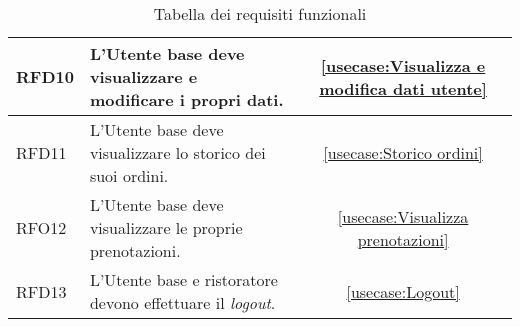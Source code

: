 \begin{table}[H]
\begin{tabularx}{\textwidth}{l|X|c}
		\hline
		RFD10       & L'Utente base deve visualizzare e modificare i propri dati.                                                 				&  \autoref{usecase:Visualizza e modifica dati utente}            \\
		\hline
		RFD11       & L'Utente base deve visualizzare lo storico dei suoi ordini.                                                    			&  \autoref{usecase:Storico ordini}           \\
		\hline
		RFO12       & L'Utente base deve visualizzare le proprie prenotazioni.						                                            &  \autoref{usecase:Visualizza prenotazioni}           \\
		\hline
		RFD13       & L'Utente base e ristoratore devono effettuare il \textit{logout}.                                                        					& \autoref{usecase:Logout}            \\
\end{tabularx}
\caption{Tabella dei requisiti funzionali}
\end{table}

